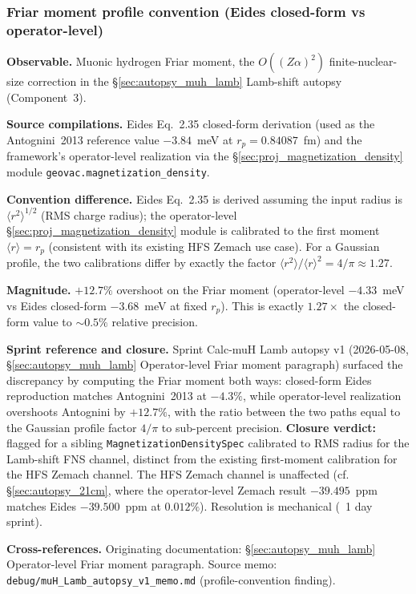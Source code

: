 \documentclass[11pt]{article}
\begin{document}
\subsubsection{Friar moment profile convention (Eides closed-form vs operator-level)}
\label{sec:conv_friar_profile}

\textbf{Observable.}  Muonic hydrogen Friar moment, the
$O((Z\alpha)^2)$ finite-nuclear-size correction in the
\S\ref{sec:autopsy_muh_lamb} Lamb-shift autopsy (Component~3).

\textbf{Source compilations.}  Eides Eq.~2.35 closed-form derivation
(used as the Antognini~2013 reference value $-3.84$~meV at $r_p =
0.84087$~fm) and the framework's operator-level realization via the
\S\ref{sec:proj_magnetization_density} module
\texttt{geovac.magnetization\_density}.

\textbf{Convention difference.}  Eides Eq.~2.35 is derived assuming
the input radius is $\langle r^2\rangle^{1/2}$ (RMS charge radius);
the operator-level
\S\ref{sec:proj_magnetization_density} module is calibrated to the
first moment $\langle r\rangle = r_p$ (consistent with its
existing HFS Zemach use case).  For a Gaussian profile, the two
calibrations differ by exactly the factor
$\langle r^2\rangle / \langle r\rangle^2 = 4/\pi \approx 1.27$.

\textbf{Magnitude.}  $+12.7\%$ overshoot on the Friar moment
(operator-level $-4.33$~meV vs Eides closed-form $-3.68$~meV at
fixed $r_p$).  This is exactly $1.27\times$ the closed-form value to
$\sim 0.5\%$ relative precision.

\textbf{Sprint reference and closure.}  Sprint Calc-muH Lamb autopsy v1
(2026-05-08, \S\ref{sec:autopsy_muh_lamb} Operator-level Friar moment
paragraph) surfaced the discrepancy by computing the Friar moment
both ways: closed-form Eides reproduction matches Antognini~2013 at
$-4.3\%$, while operator-level realization overshoots Antognini by
$+12.7\%$, with the ratio between the two paths equal to the Gaussian
profile factor $4/\pi$ to sub-percent precision.
\textbf{Closure verdict:} flagged for a sibling
\texttt{MagnetizationDensitySpec} calibrated to RMS radius for the
Lamb-shift FNS channel, distinct from the existing first-moment
calibration for the HFS Zemach channel.  The HFS Zemach channel is
unaffected (cf. \S\ref{sec:autopsy_21cm}, where the operator-level
Zemach result $-39.495$~ppm matches Eides $-39.500$~ppm at
$0.012\%$).  Resolution is mechanical (~1 day sprint).

\textbf{Cross-references.}  Originating documentation:
\S\ref{sec:autopsy_muh_lamb} Operator-level Friar moment paragraph.
Source memo: \texttt{debug/muH\_Lamb\_autopsy\_v1\_memo.md}
(profile-convention finding).
\end{document}
